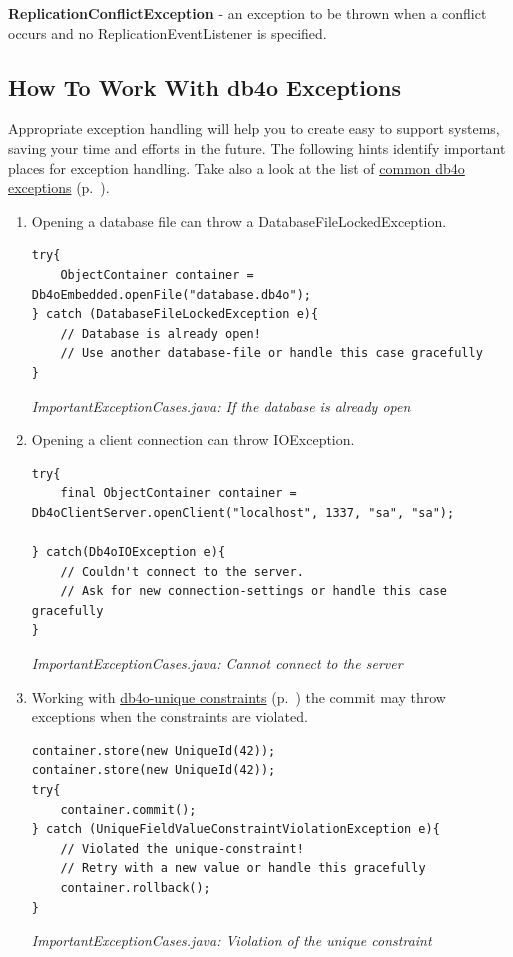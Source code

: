 \textbf{ReplicationConflictException} - an exception to be thrown when a conflict occurs and no ReplicationEventListener is specified.

\subsection{How To Work With db4o Exceptions}
\label{ref:advanced-topics-exceptions-how-to-work-with-db4o-exceptions}

Appropriate exception handling will help you to create easy to support systems, saving your time and efforts in the future. The following hints identify important places for exception handling. Take also a look at the list of \hyperref[ref:advanced-topics-exceptions-exception-types]{common db4o exceptions} (p.~\pageref{ref:advanced-topics-exceptions-exception-types}).

\begin{enumerate}
\item Opening a database file can throw a DatabaseFileLockedException.

\begin{lstlisting}
try{
    ObjectContainer container = Db4oEmbedded.openFile("database.db4o");
} catch (DatabaseFileLockedException e){
    // Database is already open!
    // Use another database-file or handle this case gracefully
}
\end{lstlisting}

{\small\itshape ImportantExceptionCases.java: If the database is already open\par}
\medskip
\item Opening a client connection can throw IOException.

\begin{lstlisting}
try{
    final ObjectContainer container = Db4oClientServer.openClient("localhost", 1337, "sa", "sa");

} catch(Db4oIOException e){
    // Couldn't connect to the server.
    // Ask for new connection-settings or handle this case gracefully
}
\end{lstlisting}

{\small\itshape ImportantExceptionCases.java: Cannot connect to the server\par}
\medskip
\item Working with \hyperref[ref:advanced-topics-unique-constraints]{db4o-unique constraints} (p.~\pageref{ref:advanced-topics-unique-constraints}) the commit may throw exceptions when the constraints are violated.

\begin{lstlisting}
container.store(new UniqueId(42));
container.store(new UniqueId(42));
try{
    container.commit();
} catch (UniqueFieldValueConstraintViolationException e){
    // Violated the unique-constraint!
    // Retry with a new value or handle this gracefully
    container.rollback();
}
\end{lstlisting}

{\small\itshape ImportantExceptionCases.java: Violation of the unique constraint\par}
\medskip
\end{enumerate}

